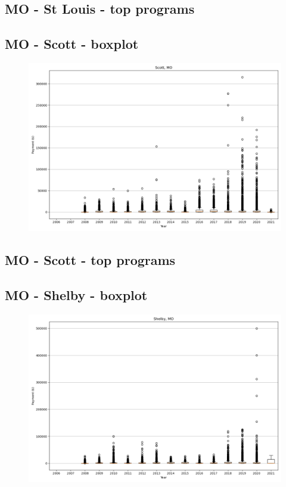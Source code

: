 \subsection*{MO - St Louis - top programs}

\newpage
\subsection*{MO - Scott - boxplot}
\begin{figure}[h]
\centering
\includegraphics[width=7in]{../output/boxplots/counties/Scott-MO_boxplot.png}
\end{figure}


\subsection*{MO - Scott - top programs}

\newpage
\subsection*{MO - Shelby - boxplot}
\begin{figure}[h]
\centering
\includegraphics[width=7in]{../output/boxplots/counties/Shelby-MO_boxplot.png}
\end{figure}


